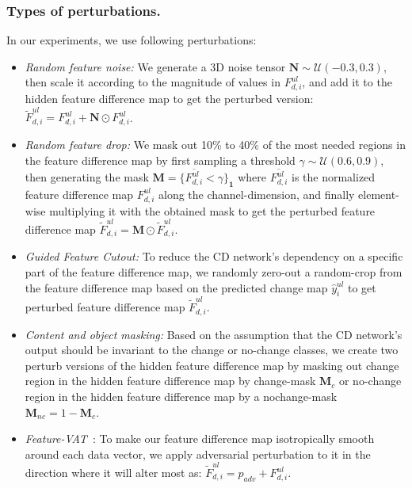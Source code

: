 \documentclass[runningheads]{llncs}
\begin{document}
\vspace{-5mm}
\subsubsection{Types of perturbations.} In our experiments, we use following perturbations:
\label{sec:types_of_pertb}
\begin{itemize}
    \item \textit{Random feature noise:} We generate a 3D noise tensor $\mathbf{N} \sim \mathcal{U}(-0.3, 0.3)$, then scale it according to the magnitude of values in $F_{d,i}^{ul}$, and add it to the hidden feature difference map to get the perturbed version: $\widetilde{F}_{d,i}^{ul} = F_{d,i}^{ul} + \mathbf{N} \odot F_{d,i}^{ul}$.
    \item \textit{Random feature drop:} We mask out 10\% to 40\% of the most needed regions in the feature difference map by first sampling a threshold $\gamma \sim \mathcal{U}(0.6, 0.9)$, then generating the mask $ \mathbf{M} =  \{ \overline{F_{d,i}^{ul}} <  \gamma \}_{\mathbf{1}}$ where $\overline{F_{d,i}^{ul}}$ is the normalized feature difference map $F_{d,i}^{ul}$ along the channel-dimension, and finally element-wise multiplying it with the obtained mask to get the perturbed feature difference map $\widetilde{F}_{d,i}^{ul} = \mathbf{M} \odot \widetilde{F}_{d,i}^{ul}$.
    \item \textit{Guided Feature Cutout:} To reduce the CD network's dependency on a specific part of the feature difference map, we randomly zero-out a random-crop from the feature difference map based on the predicted change map $\hat{y}^{ul}_i$ to get perturbed feature difference map $\widetilde{F}_{d,i}^{ul}$.
    \item \textit{Content and object masking:} Based on the assumption that the CD network's output should be invariant to the change or no-change classes, we create two perturb versions of the hidden feature difference map by masking out change region in the hidden feature difference map by change-mask $\mathbf{M}_c$ or no-change region in the hidden feature difference map by a nochange-mask $\mathbf{M}_{nc}=1-\mathbf{M}_c$. 
    \item{\textit{Feature-VAT}~\cite{miyato2018virtual}:} To make our feature difference map isotropically smooth around each data vector, we apply adversarial perturbation to it in the direction where it will alter most as: $\widetilde{F}_{d,i}^{ul} = p_{adv} + F_{d,i}^{ul}$. 
\end{itemize}
\vspace{-5mm}
\end{document}
